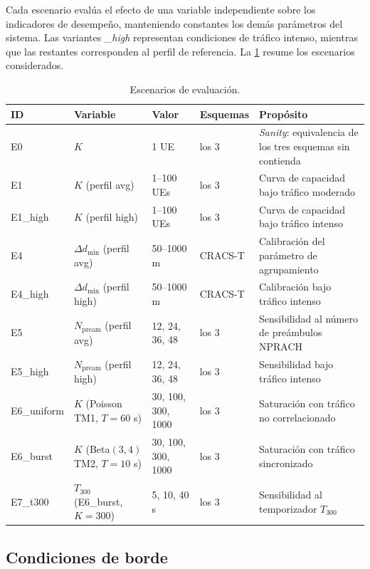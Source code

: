 Cada escenario evalúa el efecto de una variable independiente sobre los indicadores de desempeño, manteniendo constantes los demás parámetros del sistema. Las variantes \emph{\_high} representan condiciones de tráfico intenso, mientras que las restantes corresponden al perfil de referencia. La \cref{tab:escenarios} resume los escenarios considerados.
\begin{table}[H]
\centering
\caption{Escenarios de evaluación.}
\label{tab:escenarios}
\footnotesize
\begin{tabularx}{\textwidth}{@{}l l l l X@{}}
\toprule
\textbf{ID} & \textbf{Variable} & \textbf{Valor} & \textbf{Esquemas} & \textbf{Propósito} \\
\midrule
E0 & $K$ & 1 UE & los 3 & \emph{Sanity}: equivalencia de los tres esquemas sin contienda \\
\addlinespace
E1 & $K$ (perfil avg) & 1--100 UEs & los 3 & Curva de capacidad bajo tráfico moderado \\
\addlinespace
E1\_high & $K$ (perfil high) & 1--100 UEs & los 3 & Curva de capacidad bajo tráfico intenso \\
\addlinespace
E4 & $\Delta d_{\min}$ (perfil avg) & 50--1000 m & CRACS-T & Calibración del parámetro de agrupamiento \\
\addlinespace
E4\_high & $\Delta d_{\min}$ (perfil high) & 50--1000 m & CRACS-T & Calibración bajo tráfico intenso \\
\addlinespace
E5 & $N_{\text{pream}}$ (perfil avg) & 12, 24, 36, 48 & los 3 & Sensibilidad al número de preámbulos NPRACH \\
\addlinespace
E5\_high & $N_{\text{pream}}$ (perfil high) & 12, 24, 36, 48 & los 3 & Sensibilidad bajo tráfico intenso \\
\addlinespace
E6\_uniform & $K$ (Poisson TM1, $T=60$ s) & 30, 100, 300, 1000 & los 3 & Saturación con tráfico no correlacionado \\
\addlinespace
E6\_burst & $K$ (Beta$(3,4)$ TM2, $T=10$ s) & 30, 100, 300, 1000 & los 3 & Saturación con tráfico sincronizado \\
\addlinespace
E7\_t300 & $T_{300}$ (E6\_burst, $K=300$) & 5, 10, 40 s & los 3 & Sensibilidad al temporizador $T_{300}$ \\
\bottomrule
\end{tabularx}
\end{table}
\subsection{Condiciones de borde}
\label{sec:borde}

